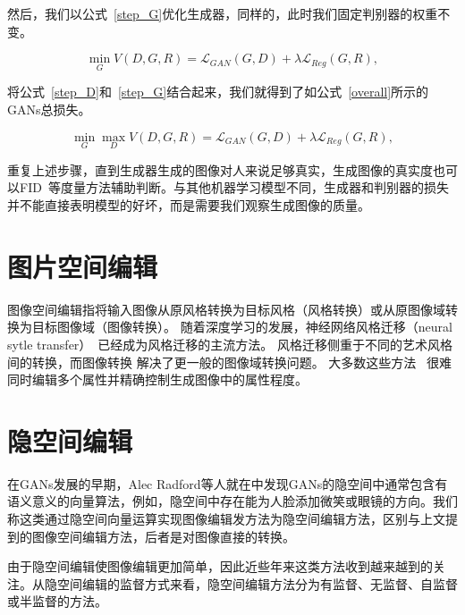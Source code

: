 然后，我们以公式~\ref{step_G}优化生成器，同样的，此时我们固定判别器的权重不变。

\begin{equation}
    \min _{G} V(D, G, R) = \mathcal{L}_{GAN}(G, D) + \lambda \mathcal{L}_{Reg}(G, R),
    \label{step_G}
\end{equation}

将公式~\ref{step_D}和~\ref{step_G}结合起来，我们就得到了如公式~\ref{overall}所示的GANs总损失。

\begin{equation}
    \min _{G} \max _{D} V(D, G, R) = \mathcal{L}_{GAN}(G, D) + \lambda \mathcal{L}_{Reg}(G, R),
    \label{overall}
\end{equation}

重复上述步骤，直到生成器生成的图像对人来说足够真实，生成图像的真实度也可以FID~\cite{FID}等度量方法辅助判断。与其他机器学习模型不同，生成器和判别器的损失并不能直接表明模型的好坏，而是需要我们观察生成图像的质量。

\section{图片空间编辑}

图像空间编辑指将输入图像从原风格转换为目标风格（风格转换）或从原图像域转换为目标图像域（图像转换）。 随着深度学习的发展，神经网络风格迁移（neural sytle transfer）~\cite{transfer0,transfer1,transfer2}已经成为风格迁移的主流方法。 风格迁移侧重于不同的艺术风格间的转换，而图像转换\cite{i2i0,i2i1,i2i2,cyclegan} 解决了更一般的图像域转换问题。
大多数这些方法~\cite{yu2018super,lu2018attribute} 很难同时编辑多个属性并精确控制生成图像中的属性程度。

\section{隐空间编辑}

在GANs发展的早期，Alec Radford等人就在\cite{DCGAN}中发现GANs的隐空间中通常包含有语义意义的向量算法，例如，隐空间中存在能为人脸添加微笑或眼镜的方向。我们称这类通过隐空间向量运算实现图像编辑发方法为隐空间编辑方法，区别与上文提到的图像空间编辑方法，后者是对图像直接的转换。

由于隐空间编辑使图像编辑更加简单，因此近些年来这类方法收到越来越到的关注。从隐空间编辑的监督方式来看，隐空间编辑方法分为有监督、无监督、自监督或半监督的方法。

